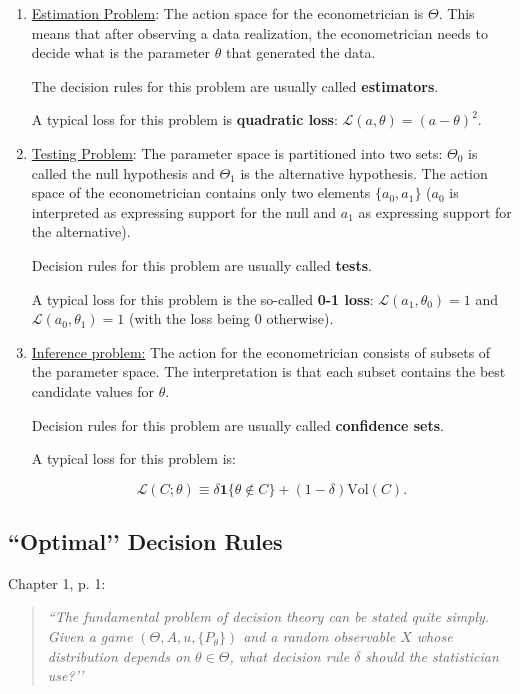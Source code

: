 \documentclass[11pt]{article} %
\begin{document}
\begin{enumerate}
\item \underline{Estimation Problem}: The action space for the econometrician is $\Theta$. This means that after observing a data realization, the econometrician needs to decide what is the parameter $\theta$ that generated the data. 

The decision rules for this problem are usually called \textbf{estimators}.

A typical loss for this problem is \textbf{quadratic loss}: $\mathcal{L}(a,\theta)=(a-\theta)^2$.


\item \underline{Testing Problem}: The parameter space is partitioned into two sets: $\Theta_0$ is called the null hypothesis and $\Theta_1$ is the alternative hypothesis. The action space of the econometrician contains only two elements $\{a_0, a_1\}$ ($a_0$ is interpreted as expressing support for the null and $a_1$ as expressing support for the alternative). 

Decision rules for this problem are usually called \textbf{tests}.

A typical loss for this problem is the so-called \textbf{0-1 loss}: $\mathcal{L}(a_1,\theta_0)=1$ and $\mathcal{L}(a_0,\theta_1)=1$ (with the loss being 0 otherwise).

\item \underline{Inference problem:} The action for the econometrician consists of subsets of the parameter space. The interpretation is that each subset contains the best candidate values for $\theta$. 

Decision rules for this problem are usually called \textbf{confidence sets}.

A typical loss for this problem is:

\[ \mathcal{L}(C;\theta)\equiv\delta \mathbf{1}\{ \theta \notin C \} + (1-\delta) \textrm{Vol}(C).  \]

\end{enumerate}

\subsection{``Optimal’’ Decision Rules}

\cite{Ferguson67} Chapter 1, p. 1: 

\begin{quote}
\emph{``The fundamental problem of decision theory can be stated quite simply. Given a game $(\Theta,A,u,\{P_{\theta}\})$ and a random observable $X$ whose distribution depends on $\theta \in \Theta$, what decision rule $\delta$ should the statistician use?’’}
\end{quote}
\end{document}
